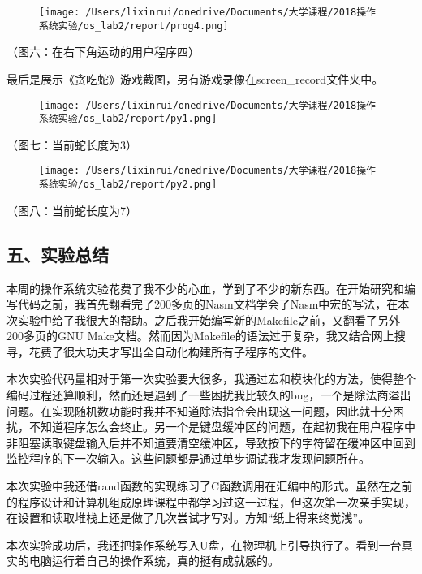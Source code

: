\documentclass[ctexart]{article}
\begin{document}
\begin{figure}
\centering
\texttt{[image: /Users/lixinrui/onedrive/Documents/大学课程/2018操作系统实验/os\_lab2/report/prog4.png]}
\caption{}
\end{figure}

（图六：在右下角运动的用户程序四）

最后是展示《贪吃蛇》游戏截图，另有游戏录像在screen\_record文件夹中。

\begin{figure}
\centering
\texttt{[image: /Users/lixinrui/onedrive/Documents/大学课程/2018操作系统实验/os\_lab2/report/py1.png]}
\caption{}
\end{figure}

（图七：当前蛇长度为3）

\begin{figure}
\centering
\texttt{[image: /Users/lixinrui/onedrive/Documents/大学课程/2018操作系统实验/os\_lab2/report/py2.png]}
\caption{}
\end{figure}

（图八：当前蛇长度为7）

\hypertarget{header-n1125}{%
\subsection{五、实验总结}\label{header-n1125}}

本周的操作系统实验花费了我不少的心血，学到了不少的新东西。在开始研究和编写代码之前，我首先翻看完了200多页的Nasm文档学会了Nasm中宏的写法，在本次实验中给了我很大的帮助。之后我开始编写新的Makefile之前，又翻看了另外200多页的GNU
Make文档。然而因为Makefile的语法过于复杂，我又结合网上搜寻，花费了很大功夫才写出全自动化构建所有子程序的文件。

本次实验代码量相对于第一次实验要大很多，我通过宏和模块化的方法，使得整个编码过程还算顺利，然而还是遇到了一些困扰我比较久的bug，一个是除法商溢出问题。在实现随机数功能时我并不知道除法指令会出现这一问题，因此就十分困扰，不知道程序怎么会终止。另一个是键盘缓冲区的问题，在起初我在用户程序中非阻塞读取键盘输入后并不知道要清空缓冲区，导致按下的字符留在缓冲区中回到监控程序的下一次输入。这些问题都是通过单步调试我才发现问题所在。

本次实验中我还借rand函数的实现练习了C函数调用在汇编中的形式。虽然在之前的程序设计和计算机组成原理课程中都学习过这一过程，但这次第一次亲手实现，在设置和读取堆栈上还是做了几次尝试才写对。方知``纸上得来终觉浅''。

本次实验成功后，我还把操作系统写入U盘，在物理机上引导执行了。看到一台真实的电脑运行着自己的操作系统，真的挺有成就感的。
\end{document}
